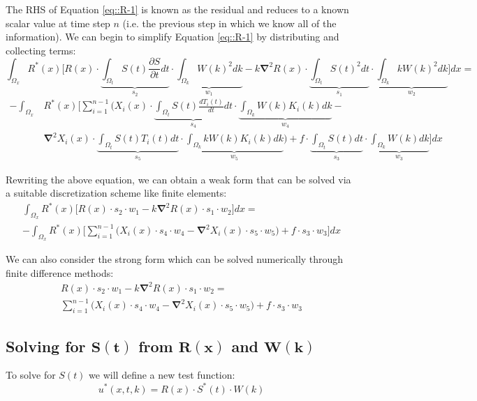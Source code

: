 \documentclass{article}
\def\ds{\displaystyle}
\def\pd{\partial}
\def\grad{\mathbf\nabla}
\begin{document}
The RHS of Equation \ref{eq::R-1} is known as the residual and reduces to a known scalar value at time step $n$ (i.e. the previous step in which we know all of the information). We can begin to simplify Equation \ref{eq::R-1} by distributing and collecting terms:
\begin{equation*}
\ds\int_{\Omega_x} R^*(x) \Bigg[ R(x)\cdot \underbrace{\ds\int_{\Omega_t} S(t)\frac{\pd S}{\pd t}dt}_{s_2} \cdot \underbrace{\ds\int_{\Omega_k} W(k)^2 dk}_{w_1} - k\grad^2 R(x) \cdot \underbrace{\ds\int_{\Omega_t} S(t)^2 dt}_{s_1} \cdot \underbrace{\ds\int_{\Omega_k} kW(k)^2 dk}_{w_2} \Bigg] dx =
\end{equation*}\vspace{-15pt}
\begin{align}
-\ds\int_{\Omega_x}& R^*(x) \Bigg[ \ds\sum_{i=1}^{n-1} \bigg(X_i(x) \cdot \underbrace{\ds\int_{\Omega_t} S(t)\frac{dT_i(t)}{dt} dt}_{s_4} \cdot \underbrace{\ds\int_{\Omega_k}W(k)K_i(k) dk}_{w_4} - \nonumber \\
& \grad^2X_i(x) \cdot \underbrace{\ds\int_{\Omega_t}S(t)T_i(t) dt}_{s_5} \cdot \underbrace{\ds\int_{\Omega_k}kW(k)K_i(k)dk}_{w_5} \bigg) + f \cdot \underbrace{\ds\int_{\Omega_t} S(t) dt}_{s_3} \cdot \underbrace{\ds\int_{\Omega_k} W(k)dk}_{w_3} \Bigg] dx
\end{align}

Rewriting the above equation, we can obtain a weak form that can be solved via a suitable discretization scheme like finite elements:
\begin{gather}
\ds\int_{\Omega_x} R^*(x) \Bigg[ R(x)\cdot s_2 \cdot w_1 - k\grad^2 R(x) \cdot s_1 \cdot w_2 \Bigg] dx = \nonumber \\
 -  \ds\int_{\Omega_x} R^*(x) \Bigg[ \ds\sum_{i=1}^{n-1} \bigg(X_i(x) \cdot s_4 \cdot w_4 - \grad^2X_i(x) \cdot s_5 \cdot w_5 \bigg) + f \cdot s_3 \cdot w_3 \Bigg] dx
\end{gather}

We can also consider the strong form which can be solved numerically through finite difference methods:
\begin{gather}
\label{eq::R-strong}
R(x)\cdot s_2 \cdot w_1 - k\grad^2 R(x) \cdot s_1 \cdot w_2 =  \nonumber \\
\ds\sum_{i=1}^{n-1} \bigg(X_i(x) \cdot s_4 \cdot w_4 - \grad^2X_i(x) \cdot s_5 \cdot w_5 \bigg) + f \cdot s_3 \cdot w_3
\end{gather}

\subsection{Solving for $\mathbf{S(t)}$ from $\mathbf{R(x)}$ and $\mathbf{W(k)}$}
To solve for $S(t)$ we will define a new test function:
\begin{equation}
\label{eq::R-TestFctn-2}
u^*(x,t,k) = R(x) \cdot S^*(t) \cdot W(k)
\end{equation}
\end{document}
